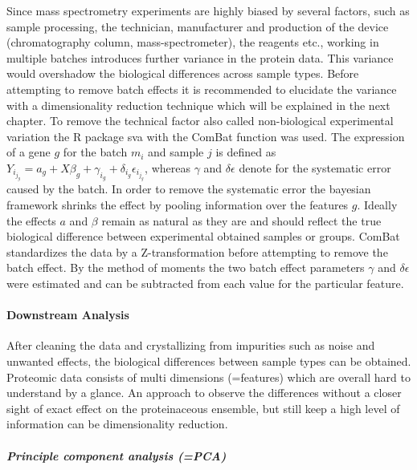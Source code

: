 \documentclass[
  11pt,
]{article}
\begin{document}
Since mass spectrometry experiments are highly biased by several
factors, such as sample processing, the technician, manufacturer and
production of the device (chromatography column, mass-spectrometer), the
reagents etc., working in multiple batches introduces further variance
in the protein data. This variance would overshadow the biological
differences across sample types. Before attempting to remove batch
effects it is recommended to elucidate the variance with a
dimensionality reduction technique which will be explained in the next
chapter. To remove the technical factor also called non-biological
experimental variation the R package sva \citep{Leek2012} with the
ComBat function \citep{Johnson2007} was used. The expression of a gene
\(g\) for the batch \(m_i\) and sample \(j\) is defined as
\(Y_i_j_g = a_g + X \beta_g + \gamma_i_g + \delta_i_g \epsilon_i_j_g\),
whereas \(\gamma\) and \(\delta\epsilon\) denote for the systematic
error caused by the batch. In order to remove the systematic error the
bayesian framework shrinks the effect by pooling information over the
features \(g\). Ideally the effects \(a\) and \(\beta\) remain as
natural as they are and should reflect the true biological difference
between experimental obtained samples or groups. ComBat standardizes the
data by a Z-transformation before attempting to remove the batch effect.
By the method of moments the two batch effect parameters \(\gamma\) and
\(\delta\epsilon\) were estimated and can be subtracted from each value
for the particular feature.

\hypertarget{downstream-analysis}{%
\paragraph{Downstream Analysis}\label{downstream-analysis}}

After cleaning the data and crystallizing from impurities such as noise
and unwanted effects, the biological differences between sample types
can be obtained. Proteomic data consists of multi dimensions (=features)
which are overall hard to understand by a glance. An approach to observe
the differences without a closer sight of exact effect on the
proteinaceous ensemble, but still keep a high level of information can
be dimensionality reduction.

\hypertarget{principle-component-analysis-pca}{%
\subparagraph{Principle component analysis
(=PCA)}\label{principle-component-analysis-pca}}
\end{document}
